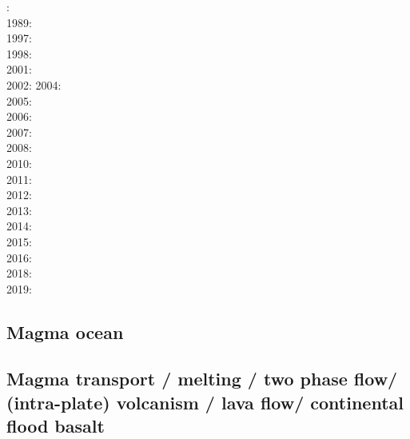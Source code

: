 {\scriptsize
{}: \cite{dagu86}\\
1989: \cite{hayu89}\\
1997: \cite{kell97}\\
1998: \cite{tack98b}\\
2001: \cite{soga01}\\
2002: \cite{somo02}\cite{tagh02}
2004: \cite{mczh04}\cite{nata04}\\
2005: \cite{mczh05a}\cite{nata05}\cite{nata05b}\\
2006: \cite{nata06}\\
2007: \cite{heta07}\\
2008: \cite{gamc08}\cite{nata08}\\
2010: \cite{stto10}\cite{mcgr10}\cite{nata10}\cite{vady10}\\
2011: \cite{bowg11}\cite{talz11}\cite{vayj11}\\
2012: \cite{stto12}\cite{dagd12}\cite{dect12}\\
2013: \cite{limc13}\cite{bogs13a}\cite{bogs13b}\\
2014: \cite{budt14}\cite{lidt14}\cite{tovd14}\\
2015: \cite{musd15}\cite{hafg15}\cite{delt15}\cite{wilm15}\\
2016: \cite{dost16}\cite{tosa16}\\
2018: \cite{daga18}\cite{lizo18}\cite{hect18}\\
2019: \cite{hebo19}\cite{rejv19}
}

\subsection{Magma ocean}

{\scriptsize
\noindent
\cite{elvh02}
\cite{devv10}
\cite{ullc12}
\cite{maha15}
}

\subsection{Magma transport / melting / two phase flow/ (intra-plate) volcanism / lava flow/ 
continental flood basalt}

